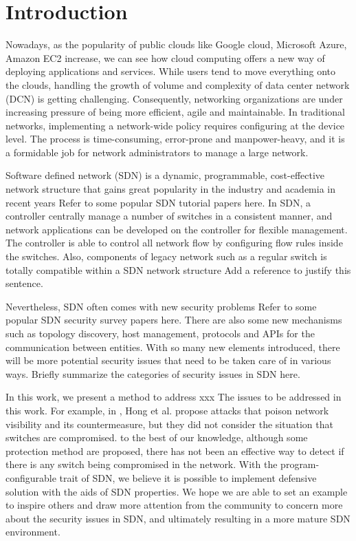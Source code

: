 \chapter{Introduction}
\label{chap:intro}
\setcounter{page}{1}

Nowadays, as the popularity of public clouds like Google cloud, Microsoft Azure, Amazon EC2 increase, we can see how cloud computing offers a new way of deploying applications and services. While users tend to move everything onto the clouds, handling the growth of volume and complexity of data center network (DCN) is getting challenging. Consequently, networking organizations are under increasing pressure of being more efficient, agile and maintainable. In traditional networks, implementing a network-wide policy requires configuring at the device level. The process is time-consuming, error-prone and manpower-heavy, and it is a formidable job for network administrators to manage a large network.

Software defined network (SDN) is a dynamic, programmable, cost-effective network structure that gains great popularity in the industry and academia in recent years {\color{red} Refer to some popular SDN tutorial papers here}. In SDN, a controller centrally manage a number of switches in a consistent manner, and network applications can be developed on the controller for flexible management. The controller is able to control all network flow by configuring flow rules inside the switches. Also, components of legacy network such as a regular switch is totally compatible within a SDN network structure {\color{red} Add a reference to justify this sentence}.

Nevertheless, SDN often comes with new security problems {\color{red} Refer to some popular SDN security survey papers here}. There are also some new mechanisms such as topology discovery, host management, protocols and APIs for the communication between entities. With so many new elements introduced, there will be more potential security issues that need to be taken care of in various ways. {\color{red} Briefly summarize the categories of security issues in SDN here.}

In this work, we present a method to address xxx {\color{red} The issues to be addressed in this work}. For example, in \cite{HXWG15}, Hong et al. propose attacks that poison network visibility and its countermeasure, but they did not consider the situation that switches are compromised. to the best of our knowledge, although some protection method are proposed, there has not been an effective way to detect if there is any switch being compromised in the network. With the program-configurable trait of SDN, we believe it is possible to implement defensive solution with the aids of SDN properties. We hope we are able to set an example to inspire others and draw more attention from the community to concern more about the security issues in SDN, and ultimately resulting in a more mature SDN environment.

